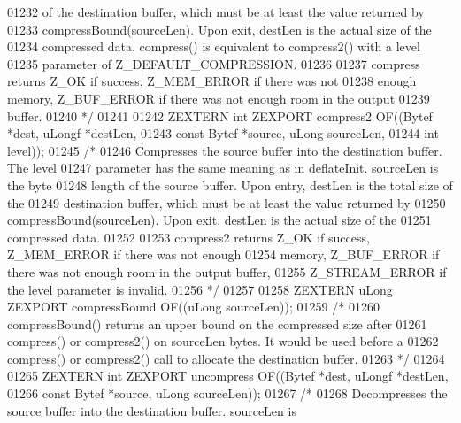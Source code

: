 \begin{DoxyCode}
01232 \textcolor{comment}{   of the destination buffer, which must be at least the value returned by}
01233 \textcolor{comment}{   compressBound(sourceLen).  Upon exit, destLen is the actual size of the}
01234 \textcolor{comment}{   compressed data.  compress() is equivalent to compress2() with a level}
01235 \textcolor{comment}{   parameter of Z\_DEFAULT\_COMPRESSION.}
01236 \textcolor{comment}{}
01237 \textcolor{comment}{     compress returns Z\_OK if success, Z\_MEM\_ERROR if there was not}
01238 \textcolor{comment}{   enough memory, Z\_BUF\_ERROR if there was not enough room in the output}
01239 \textcolor{comment}{   buffer.}
01240 \textcolor{comment}{*/}
01241 
01242 ZEXTERN \textcolor{keywordtype}{int} ZEXPORT compress2 OF((Bytef *dest,   uLongf *destLen,
01243                                   \textcolor{keyword}{const} Bytef *source, uLong sourceLen,
01244                                   \textcolor{keywordtype}{int} level));
01245 \textcolor{comment}{/*}
01246 \textcolor{comment}{     Compresses the source buffer into the destination buffer.  The level}
01247 \textcolor{comment}{   parameter has the same meaning as in deflateInit.  sourceLen is the byte}
01248 \textcolor{comment}{   length of the source buffer.  Upon entry, destLen is the total size of the}
01249 \textcolor{comment}{   destination buffer, which must be at least the value returned by}
01250 \textcolor{comment}{   compressBound(sourceLen).  Upon exit, destLen is the actual size of the}
01251 \textcolor{comment}{   compressed data.}
01252 \textcolor{comment}{}
01253 \textcolor{comment}{     compress2 returns Z\_OK if success, Z\_MEM\_ERROR if there was not enough}
01254 \textcolor{comment}{   memory, Z\_BUF\_ERROR if there was not enough room in the output buffer,}
01255 \textcolor{comment}{   Z\_STREAM\_ERROR if the level parameter is invalid.}
01256 \textcolor{comment}{*/}
01257 
01258 ZEXTERN uLong ZEXPORT compressBound OF((uLong sourceLen));
01259 \textcolor{comment}{/*}
01260 \textcolor{comment}{     compressBound() returns an upper bound on the compressed size after}
01261 \textcolor{comment}{   compress() or compress2() on sourceLen bytes.  It would be used before a}
01262 \textcolor{comment}{   compress() or compress2() call to allocate the destination buffer.}
01263 \textcolor{comment}{*/}
01264 
01265 ZEXTERN \textcolor{keywordtype}{int} ZEXPORT uncompress OF((Bytef *dest,   uLongf *destLen,
01266                                    \textcolor{keyword}{const} Bytef *source, uLong sourceLen));
01267 \textcolor{comment}{/*}
01268 \textcolor{comment}{     Decompresses the source buffer into the destination buffer.  sourceLen is}

\end{DoxyCode}
